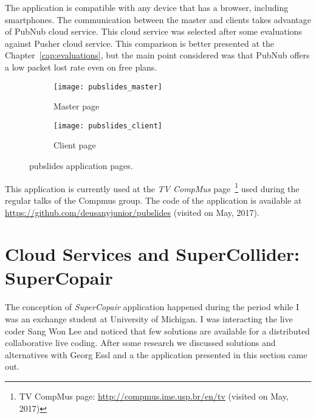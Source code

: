 The application is compatible with any device that has a browser, including smartphones.
The communication between the master and clients takes advantage of PubNub cloud service.
This cloud service was selected after some evaluations against Pusher cloud service.
This comparison is better presented at the Chapter~\ref{cap:evaluations}, but the main point considered was that PubNub offers a low packet lost rate even on free plans.

\begin{figure*}[!ht]
	\centering
	\begin{subfigure}{.45\textwidth}
		\texttt{[image: pubslides\_master]}
		\caption{Master page}
		\label{fig:pubslidesmaster}
	\end{subfigure}
	\begin{subfigure}{.45\textwidth}
		\texttt{[image: pubslides\_client]}
		\caption{Client page}
		\label{fig:pubslidesclient}
	\end{subfigure}
	
	\caption{pubslides application pages.}
	\label{fig:pubslidesapplication}
\end{figure*}


This application is currently used at the \textit{TV CompMus} page~\footnote{TV CompMus page: \url{http://compmus.ime.usp.br/en/tv} (visited on May, 2017)} used during the regular talks of the Compmus group.
The code of the application is available at \url{https://github.com/deusanyjunior/pubslides} (visited on May, 2017).

\section{Cloud Services and SuperCollider: SuperCopair}
\label{apesec:appsupercopair}

The conception of \textit{SuperCopair} application happened during the period while I was an exchange student at University of Michigan.
I was interacting the live coder Sang Won Lee and noticed that few solutions are available for a distributed collaborative live coding.
After some research we discussed solutions and alternatives with Georg Essl and a the application presented in this section came out.

